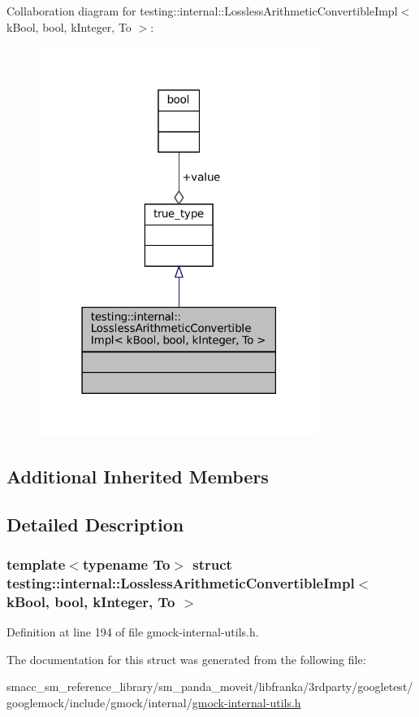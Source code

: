 Collaboration diagram for testing\+:\+:internal\+:\+:Lossless\+Arithmetic\+Convertible\+Impl$<$ k\+Bool, bool, k\+Integer, To $>$\+:
\nopagebreak
\begin{figure}[H]
\begin{center}
\leavevmode
\includegraphics[width=259pt]{structtesting_1_1internal_1_1LosslessArithmeticConvertibleImpl_3_01kBool_00_01bool_00_01kInteger_00_01To_01_4__coll__graph}
\end{center}
\end{figure}
\subsection*{Additional Inherited Members}


\subsection{Detailed Description}
\subsubsection*{template$<$typename To$>$\newline
struct testing\+::internal\+::\+Lossless\+Arithmetic\+Convertible\+Impl$<$ k\+Bool, bool, k\+Integer, To $>$}



Definition at line 194 of file gmock-\/internal-\/utils.\+h.



The documentation for this struct was generated from the following file\+:\begin{DoxyCompactItemize}
\item 
smacc\+\_\+sm\+\_\+reference\+\_\+library/sm\+\_\+panda\+\_\+moveit/libfranka/3rdparty/googletest/googlemock/include/gmock/internal/\hyperlink{gmock-internal-utils_8h}{gmock-\/internal-\/utils.\+h}\end{DoxyCompactItemize}
